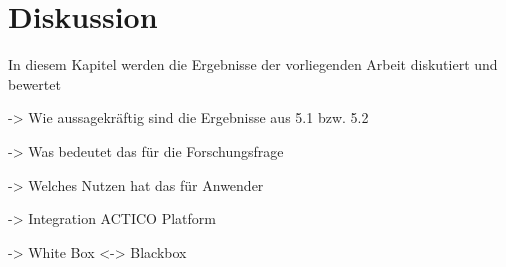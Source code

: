 \chapter{Diskussion}

In diesem Kapitel werden die Ergebnisse der vorliegenden Arbeit diskutiert und bewertet

-> Wie aussagekräftig sind die Ergebnisse aus 5.1 bzw. 5.2

-> Was bedeutet das für die Forschungsfrage 

-> Welches Nutzen hat das für Anwender

-> Integration ACTICO Platform 

-> White Box <-> Blackbox